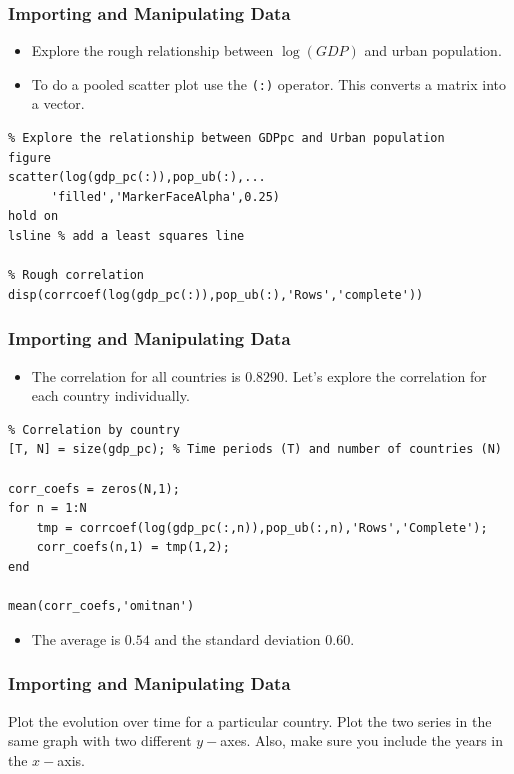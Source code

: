 \documentclass[11pt,xcolor={svgnames},aspectratio=169,usepdftitle=false,notheorems]{beamer}
\begin{document}
\begin{frame}[fragile]
  \frametitle{Importing and Manipulating Data}
\begin{itemize}
  \item Explore the rough relationship between $\log(GDP)$ and urban population.
  \item To do a pooled scatter plot use the \verb;(:); operator. This converts a matrix into a vector.
\end{itemize}
\begin{lstlisting}
% Explore the relationship between GDPpc and Urban population
figure
scatter(log(gdp_pc(:)),pop_ub(:),...
      'filled','MarkerFaceAlpha',0.25)
hold on
lsline % add a least squares line

% Rough correlation
disp(corrcoef(log(gdp_pc(:)),pop_ub(:),'Rows','complete'))
\end{lstlisting}
\end{frame}

\begin{frame}[fragile]
  \frametitle{Importing and Manipulating Data}
\begin{itemize}
  \item The correlation for all countries is $0.8290$. Let's explore the correlation for each country individually.
\end{itemize}
\begin{lstlisting}
% Correlation by country
[T, N] = size(gdp_pc); % Time periods (T) and number of countries (N)

corr_coefs = zeros(N,1);
for n = 1:N
    tmp = corrcoef(log(gdp_pc(:,n)),pop_ub(:,n),'Rows','Complete');
    corr_coefs(n,1) = tmp(1,2);
end

mean(corr_coefs,'omitnan')
\end{lstlisting}
\begin{itemize}
  \item The average is $0.54$ and the standard deviation $0.60$.
\end{itemize}
\end{frame}

\begin{frame}[fragile]
  \frametitle{Importing and Manipulating Data}
\begin{exercise}
Plot the evolution over time for a particular country. Plot the two series in the same graph with two different $y-$axes. Also, make sure you include the years in the $x-$axis.
\end{exercise}
\end{frame}
\end{document}

